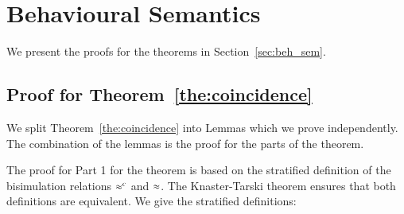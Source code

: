 \section{Behavioural Semantics}

We present the proofs for the theorems in
Section~\ref{sec:beh_sem}.

\subsection{Proof for Theorem~\ref{the:coincidence}}

We split Theorem~\ref{the:coincidence} into 
Lemmas which we prove independently.
The combination of the lemmas is the proof for the parts
of the theorem.

The proof for Part 1 for the theorem is based on the
stratified definition of the bisimulation relations
$\approx^{c}$ and $\approx$. The Knaster-Tarski theorem ensures
that both definitions are equivalent.
We give the stratified  definitions:


